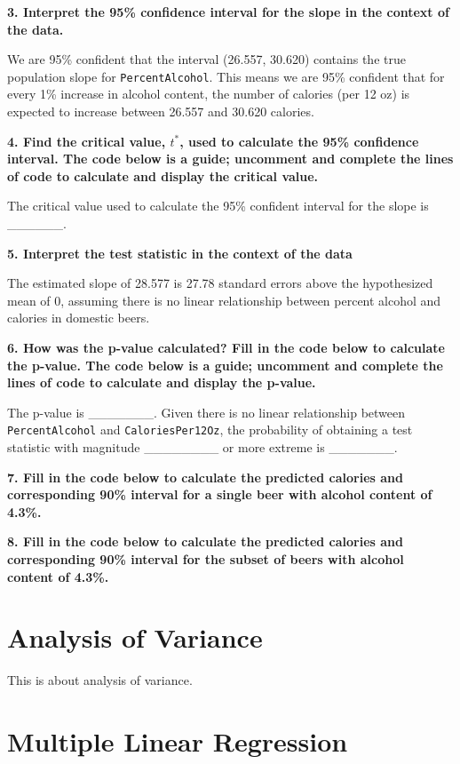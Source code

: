 \documentclass[]{book}
\begin{document}
\textbf{3. Interpret the 95\% confidence interval for the slope in the
context of the data.}

We are 95\% confident that the interval (26.557, 30.620) contains the
true population slope for \texttt{PercentAlcohol}. This means we are
95\% confident that for every 1\% increase in alcohol content, the
number of calories (per 12 oz) is expected to increase between 26.557
and 30.620 calories.

\textbf{4. Find the critical value, \(t^*\), used to calculate the 95\%
confidence interval. The code below is a guide; uncomment and complete
the lines of code to calculate and display the critical value.}

The critical value used to calculate the 95\% confident interval for the
slope is \_\_\_\_\_\_.

\textbf{5. Interpret the test statistic in the context of the data}

The estimated slope of 28.577 is 27.78 standard errors above the
hypothesized mean of 0, assuming there is no linear relationship between
percent alcohol and calories in domestic beers.

\textbf{6. How was the p-value calculated? Fill in the code below to
calculate the p-value. The code below is a guide; uncomment and complete
the lines of code to calculate and display the p-value.}

The p-value is \_\_\_\_\_\_\_. Given there is no linear relationship
between \texttt{PercentAlcohol} and \texttt{CaloriesPer12Oz}, the
probability of obtaining a test statistic with magnitude
\_\_\_\_\_\_\_\_ or more extreme is \_\_\_\_\_\_\_.

\textbf{7. Fill in the code below to calculate the predicted calories
and corresponding 90\% interval for a single beer with alcohol content
of 4.3\%.}

\textbf{8. Fill in the code below to calculate the predicted calories
and corresponding 90\% interval for the subset of beers with alcohol
content of 4.3\%.}

\chapter{Analysis of Variance}\label{anova}

This is about analysis of variance.

\chapter{Multiple Linear Regression}\label{mlr}
\end{document}
